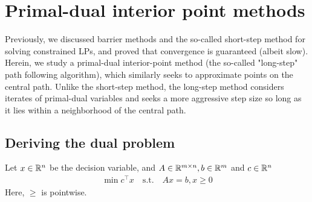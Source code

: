 \section{Primal-dual interior point methods}
Previously, we discussed barrier methods and the so-called short-step method for
solving constrained LPs, and proved that convergence is guaranteed (albeit
slow). Herein, we study a primal-dual interior-point method (the so-called
"long-step"  path following algorithm), which similarly seeks to approximate
points on the central path. Unlike the short-step method, the long-step method
considers iterates of primal-dual variables and seeks a more aggressive step size so long as it lies within a neighborhood of the central path.

\subsection{Deriving the dual problem}

Let $x \in \mathbb{R}^n$ be the decision variable, and $A \in \mathbb{R}^{m \times n},b \in \mathbb{R}^m$ and $c \in \mathbb{R}^n$
\begin{eqnarray*}
\min c^\top x \quad \text{s.t.}\quad Ax = b, x \ge 0 
\end{eqnarray*}
Here, $\ge$ is pointwise.


